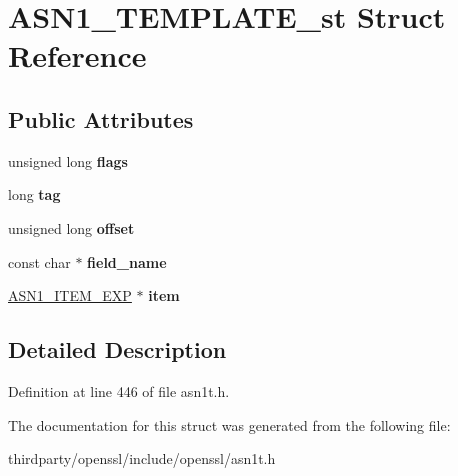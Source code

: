 \hypertarget{struct_a_s_n1___t_e_m_p_l_a_t_e__st}{}\section{A\+S\+N1\+\_\+\+T\+E\+M\+P\+L\+A\+T\+E\+\_\+st Struct Reference}
\label{struct_a_s_n1___t_e_m_p_l_a_t_e__st}
\subsection*{Public Attributes}
\begin{DoxyCompactItemize}
\item 
\mbox{\label{struct_a_s_n1___t_e_m_p_l_a_t_e__st_aadbe8b5ea9d41920c3fc59d6c65848a8}} 
unsigned long {\bfseries flags}
\item 
\mbox{\label{struct_a_s_n1___t_e_m_p_l_a_t_e__st_a8ef37d4a92684f1305627489e11a6b2e}} 
long {\bfseries tag}
\item 
\mbox{\label{struct_a_s_n1___t_e_m_p_l_a_t_e__st_a6fed94625b157be3f3513fda21ae464f}} 
unsigned long {\bfseries offset}
\item 
\mbox{\label{struct_a_s_n1___t_e_m_p_l_a_t_e__st_af497df5141e17637e18b4857c147ca73}} 
const char $\ast$ {\bfseries field\+\_\+name}
\item 
\mbox{\label{struct_a_s_n1___t_e_m_p_l_a_t_e__st_a1f27bffc57ff2163fb587c3da0cf1f9e}} 
\hyperlink{struct_a_s_n1___i_t_e_m__st}{A\+S\+N1\+\_\+\+I\+T\+E\+M\+\_\+\+E\+XP} $\ast$ {\bfseries item}
\end{DoxyCompactItemize}


\subsection{Detailed Description}


Definition at line 446 of file asn1t.\+h.



The documentation for this struct was generated from the following file\+:\begin{DoxyCompactItemize}
\item 
thirdparty/openssl/include/openssl/asn1t.\+h\end{DoxyCompactItemize}
